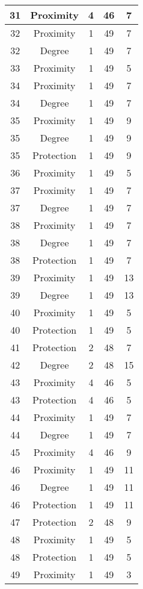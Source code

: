\documentclass[results.tex]{subfiles}
\begin{document}
\begin{center}
\begin{tabular}{| c || c | c | c | c |}
    \hline
    31 & Proximity & 4 & 46 & 7 \\ 
    \hline
    32 & Proximity & 1 & 49 & 7 \\ 
    \hline
    32 & Degree & 1 & 49 & 7 \\ 
    \hline
    33 & Proximity & 1 & 49 & 5 \\ 
    \hline
    34 & Proximity & 1 & 49 & 7 \\ 
    \hline
    34 & Degree & 1 & 49 & 7 \\ 
    \hline
    35 & Proximity & 1 & 49 & 9 \\ 
    \hline
    35 & Degree & 1 & 49 & 9 \\ 
    \hline
    35 & Protection & 1 & 49 & 9 \\ 
    \hline
    36 & Proximity & 1 & 49 & 5 \\ 
    \hline
    37 & Proximity & 1 & 49 & 7 \\ 
    \hline
    37 & Degree & 1 & 49 & 7 \\ 
    \hline
    38 & Proximity & 1 & 49 & 7 \\ 
    \hline
    38 & Degree & 1 & 49 & 7 \\ 
    \hline
    38 & Protection & 1 & 49 & 7 \\ 
    \hline
    39 & Proximity & 1 & 49 & 13 \\ 
    \hline
    39 & Degree & 1 & 49 & 13 \\ 
    \hline
    40 & Proximity & 1 & 49 & 5 \\ 
    \hline
    40 & Protection & 1 & 49 & 5 \\ 
    \hline
    41 & Protection & 2 & 48 & 7 \\ 
    \hline
    42 & Degree & 2 & 48 & 15 \\ 
    \hline
    43 & Proximity & 4 & 46 & 5 \\ 
    \hline
    43 & Protection & 4 & 46 & 5 \\ 
    \hline
    44 & Proximity & 1 & 49 & 7 \\ 
    \hline
    44 & Degree & 1 & 49 & 7 \\ 
    \hline
    45 & Proximity & 4 & 46 & 9 \\ 
    \hline
    46 & Proximity & 1 & 49 & 11 \\ 
    \hline
    46 & Degree & 1 & 49 & 11 \\ 
    \hline
    46 & Protection & 1 & 49 & 11 \\ 
    \hline
    47 & Protection & 2 & 48 & 9 \\ 
    \hline
    48 & Proximity & 1 & 49 & 5 \\ 
    \hline
    48 & Protection & 1 & 49 & 5 \\ 
    \hline
    49 & Proximity & 1 & 49 & 3 \\ 
    \hline   \end{tabular}
\end{center}
\end{document}
